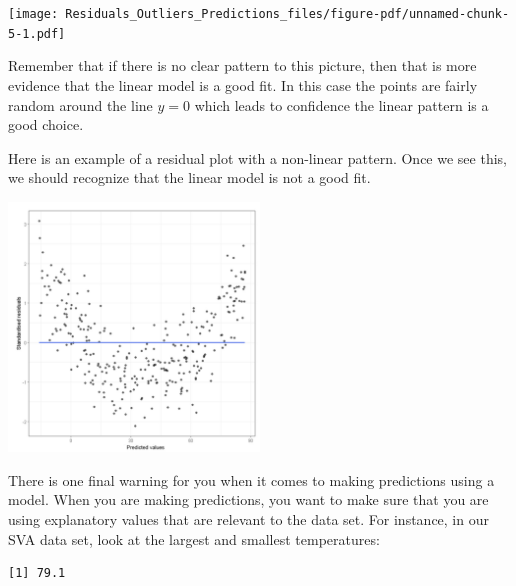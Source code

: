 \documentclass[
  letterpaper,
  DIV=11,
  numbers=noendperiod]{scrreprt}
\newenvironment{Shaded}{\begin{snugshade}}{\end{snugshade}}
\newcommand{\CommentTok}[1]{\textcolor[rgb]{0.37,0.37,0.37}{#1}}
\newcommand{\FunctionTok}[1]{\textcolor[rgb]{0.28,0.35,0.67}{#1}}
\newcommand{\NormalTok}[1]{\textcolor[rgb]{0.00,0.23,0.31}{#1}}
\newcommand{\SpecialCharTok}[1]{\textcolor[rgb]{0.37,0.37,0.37}{#1}}
\begin{document}
\texttt{[image: Residuals\_Outliers\_Predictions\_files/figure-pdf/unnamed-chunk-5-1.pdf]}

Remember that if there is no clear pattern to this picture, then that is
more evidence that the linear model is a good fit. In this case the
points are fairly random around the line \(y = 0\) which leads to
confidence the linear pattern is a good choice.

Here is an example of a residual plot with a non-linear pattern. Once we
see this, we should recognize that the linear model is not a good fit.

\includegraphics[width=0.5\textwidth,height=\textheight]{./images/ROP_9.jpg}

There is one final warning for you when it comes to making predictions
using a model. When you are making predictions, you want to make sure
that you are using explanatory values that are relevant to the data set.
For instance, in our SVA data set, look at the largest and smallest
temperatures:

\begin{Shaded}
\end{Shaded}

\begin{verbatim}
[1] 79.1
\end{verbatim}

\begin{Shaded}
\end{Shaded}
\end{document}
